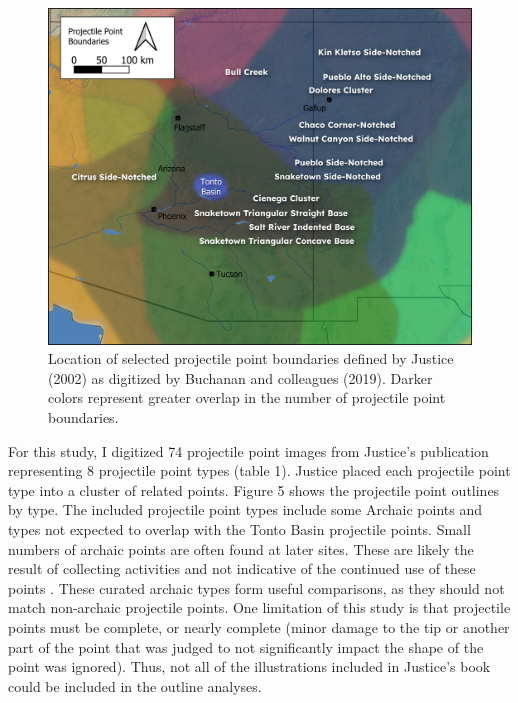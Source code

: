 \documentclass[letterpaper]{article}
\begin{document}
\begin{figure}
\includegraphics[width=1\linewidth]{figures/ProjPointBoundaries} \caption{Location of selected projectile point boundaries defined by Justice (2002) as digitized by Buchanan and colleagues (2019). Darker colors represent greater overlap in the number of projectile point boundaries.}\label{fig:ProjectilePointBoundaries}
\end{figure}

For this study, I digitized 74 projectile point images from Justice's publication representing 8 projectile point types (table 1). Justice placed each projectile point type into a cluster of related points. Figure 5 shows the projectile point outlines by type. The included projectile point types include some Archaic points and types not expected to overlap with the Tonto Basin projectile points. Small numbers of archaic points are often found at later sites. These are likely the result of collecting activities and not indicative of the continued use of these points \autocite[see][ for numerous examples]{Justice2002-cf}. These curated archaic types form useful comparisons, as they should not match non-archaic projectile points. One limitation of this study is that projectile points must be complete, or nearly complete (minor damage to the tip or another part of the point that was judged to not significantly impact the shape of the point was ignored). Thus, not all of the illustrations included in Justice's book could be included in the outline analyses.
\end{document}
